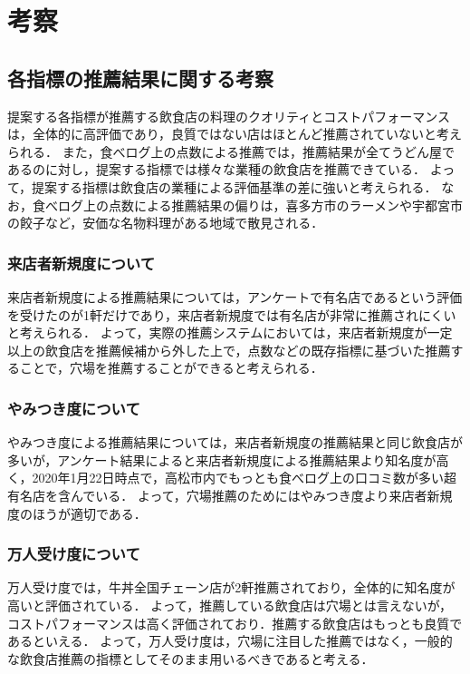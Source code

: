 \chapter{考察}

\label{chap:discussion}

\section{各指標の推薦結果に関する考察}
提案する各指標が推薦する飲食店の料理のクオリティとコストパフォーマンスは，全体的に高評価であり，良質ではない店はほとんど推薦されていないと考えられる．
また，食べログ上の点数による推薦では，推薦結果が全てうどん屋であるのに対し，提案する指標では様々な業種の飲食店を推薦できている．
よって，提案する指標は飲食店の業種による評価基準の差に強いと考えられる．
なお，食べログ上の点数による推薦結果の偏りは，喜多方市のラーメンや宇都宮市の餃子など，安価な名物料理がある地域で散見される．
\par
\subsection{来店者新規度について}
来店者新規度による推薦結果については，アンケートで有名店であるという評価を受けたのが1軒だけであり，来店者新規度では有名店が非常に推薦されにくいと考えられる．
よって，実際の推薦システムにおいては，来店者新規度が一定以上の飲食店を推薦候補から外した上で，点数などの既存指標に基づいた推薦することで，穴場を推薦することができると考えられる．\par

\subsection{やみつき度について}
やみつき度による推薦結果については，来店者新規度の推薦結果と同じ飲食店が多いが，アンケート結果によると来店者新規度による推薦結果より知名度が高く，2020年1月22日時点で，高松市内でもっとも食べログ上の口コミ数が多い超有名店を含んでいる．
よって，穴場推薦のためにはやみつき度より来店者新規度のほうが適切である．\par

\subsection{万人受け度について}
万人受け度では，牛丼全国チェーン店が2軒推薦されており，全体的に知名度が高いと評価されている．
よって，推薦している飲食店は穴場とは言えないが，コストパフォーマンスは高く評価されており．推薦する飲食店はもっとも良質であるといえる．
よって，万人受け度は，穴場に注目した推薦ではなく，一般的な飲食店推薦の指標としてそのまま用いるべきであると考える．

